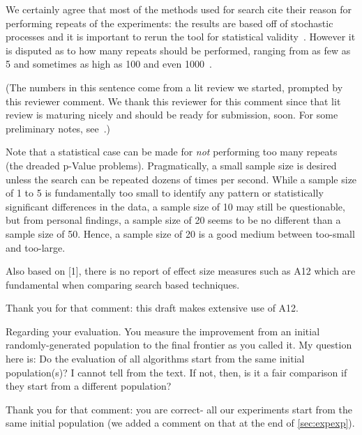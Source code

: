 \documentclass[10pt,journal,compsoc]{IEEEtran}
\newcommand{\tion}[1]{\textsection\ref{sec:#1}}
\newenvironment{changed}{\par}{\par}
\begin{document}
\begin{changed}

We certainly agree that most of the methods used for
search cite their reason for performing repeats of
the experiments: the results are based off of
stochastic processes and it is important to rerun
the tool for statistical validity~\cite{1334912}.
However it is disputed as to how many repeats should
be performed, ranging from as few as 5 and sometimes
as high as 100 and even 1000~\cite{krall14f}.

(The numbers in this sentence
come from a lit review we started, prompted by this reviewer comment. We thank
this reviewer for this comment since that lit review is maturing nicely and should be ready for submission, soon.
For some preliminary notes, see~\cite{krall14f}.)

Note that a statistical case can be made for {\em not} performing too many repeats~\cite{isre.2013.0480}
(the dreaded p-Value problems).
Pragmatically, a small sample size is desired unless
the search can be repeated dozens of times per
second.  While a sample size of 1 to 5 is
fundamentally too small to identify any pattern or
statistically significant differences in the data, a
sample size of 10 may still be questionable, but
from personal findings, a sample size of 20 seems to
be no different than a sample size of 50.  Hence, a
sample size of 20 is a good medium between too-small
and too-large.


\end{changed}

Also based on [1], there is no report of effect size measures such as A12 which are fundamental when comparing search based techniques.

\begin{changed}
Thank you for that comment: this draft makes extensive use of A12.
\end{changed}

Regarding your evaluation. You measure the improvement from an initial randomly-generated population to the final frontier as you called it. My question here is: Do the evaluation of all algorithms start from the same initial population(s)? I cannot tell from the text. If not, then, is it a fair comparison if they start from a different population?

\begin{changed}
Thank you for that comment: you are correct- all our experiments start from the same initial population
(we added a comment on that at the end of \tion{expexp}).
\end{changed}
\end{document}
